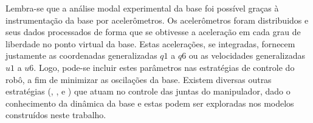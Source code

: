 Lembra-se que a análise modal experimental da base foi possível graças à
instrumentação da base por acelerômetros. Os acelerômetros foram distribuidos e
seus dados processados de forma que se obtivesse a aceleração em cada grau de
liberdade no ponto virtual da base. Estas acelerações, se integradas, fornecem
justamente as coordenadas generalizadas $q1$ a $q6$ ou as velocidades
generalizadas $u1$ a $u6$. Logo, pode-se incluir estes parâmetros nas
estratégias de controle do robô, a fim de minimizar as oscilações da base.
Existem diversas outras estratégias (\cite{george2002inertial},
\cite{kwon1994input}, \cite{tahboub1998intelligent} e
\cite{nenchev1999reaction}) que atuam no controle das juntas do manipulador,
dado o conhecimento da dinâmica da base e estas podem ser exploradas nos modelos
construídos neste trabalho.



